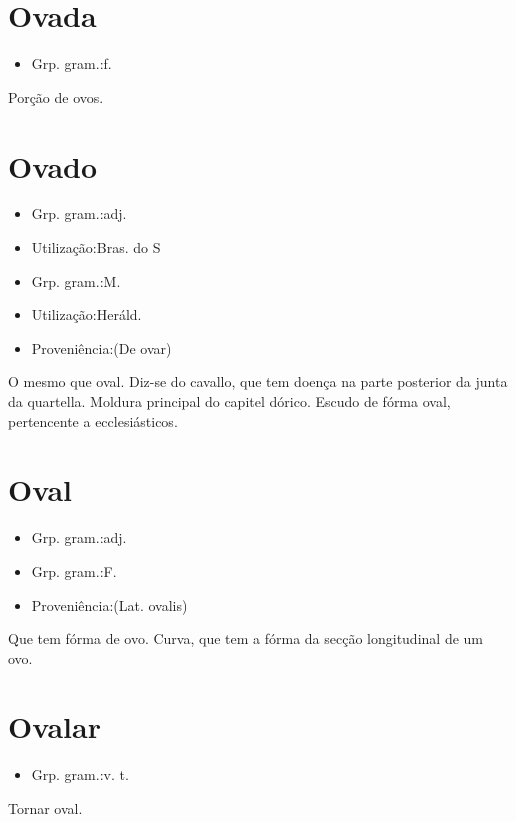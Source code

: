 \section{Ovada}
\begin{itemize}
\item {Grp. gram.:f.}
\end{itemize}
Porção de ovos.
\section{Ovado}
\begin{itemize}
\item {Grp. gram.:adj.}
\end{itemize}
\begin{itemize}
\item {Utilização:Bras. do S}
\end{itemize}
\begin{itemize}
\item {Grp. gram.:M.}
\end{itemize}
\begin{itemize}
\item {Utilização:Heráld.}
\end{itemize}
\begin{itemize}
\item {Proveniência:(De \textunderscore ovar\textunderscore )}
\end{itemize}
O mesmo que \textunderscore oval\textunderscore .
Diz-se do cavallo, que tem doença na parte posterior da junta da quartella.
Moldura principal do capitel dórico.
Escudo de fórma oval, pertencente a ecclesiásticos.
\section{Oval}
\begin{itemize}
\item {Grp. gram.:adj.}
\end{itemize}
\begin{itemize}
\item {Grp. gram.:F.}
\end{itemize}
\begin{itemize}
\item {Proveniência:(Lat. \textunderscore ovalis\textunderscore )}
\end{itemize}
Que tem fórma de ovo.
Curva, que tem a fórma da secção longitudinal de um ovo.
\section{Ovalar}
\begin{itemize}
\item {Grp. gram.:v. t.}
\end{itemize}
Tornar oval.

